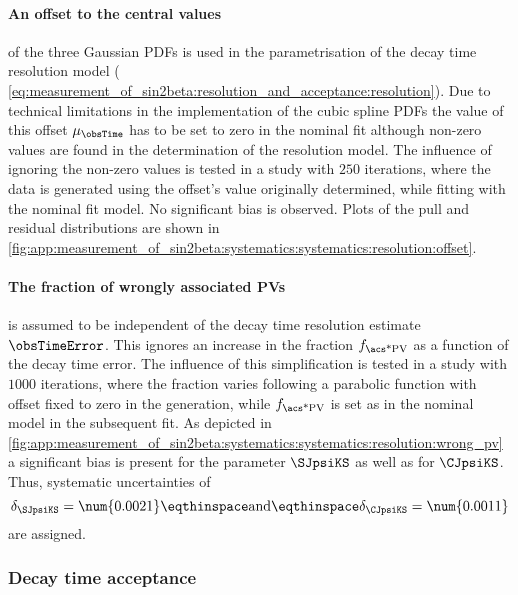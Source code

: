 \paragraph{An offset to the central values} of the three Gaussian \acp{PDF} is
used in the parametrisation of the decay time resolution model (\cf
\cref{eq:measurement_of_sin2beta:resolution_and_acceptance:resolution}). Due to
technical limitations in the implementation of the cubic spline \acp{PDF} the
value of this offset $\mu_{\obsTime}$ has to be set to zero in the nominal fit
although non-zero values are found in the determination of the resolution model.
The influence of ignoring the non-zero values is tested in a \ToyMC study with
$\num{250}$ iterations, where the data is generated using the offset's value
originally determined, while fitting with the nominal fit model. No significant
bias is observed. Plots of the pull and residual distributions are shown in
\cref{fig:app:measurement_of_sin2beta:systematics:systematics:resolution:offset}.

\paragraph{The fraction of wrongly associated \acp{PV}} is assumed to be
independent of the decay time resolution estimate $\obsTimeError$. This ignores
an increase in the fraction $f_\text{\acs*{PV}}$ as a function of the decay time
error. The influence of this simplification is tested in a \ToyMC study with
$\num{1000}$ iterations, where the fraction varies following a parabolic
function with offset fixed to zero in the generation, while $f_\text{\acs*{PV}}$
is set as in the nominal model in the subsequent fit. As depicted in
\cref{fig:app:measurement_of_sin2beta:systematics:systematics:resolution:wrong_pv} 
a significant bias is present for the parameter $\SJpsiKS$ as well as for
$\CJpsiKS$. Thus, systematic uncertainties of
%
\begin{equation}
  \delta_{\SJpsiKS} = \num{0.0021}\eqthinspace\text{and}\eqthinspace\delta_{\CJpsiKS} = \num{0.0011}
\end{equation}
%
are assigned.

\subsubsection{Decay time acceptance}
\label{sec:measurement_of_sin2beta:systematics:systematics:acceptance}

